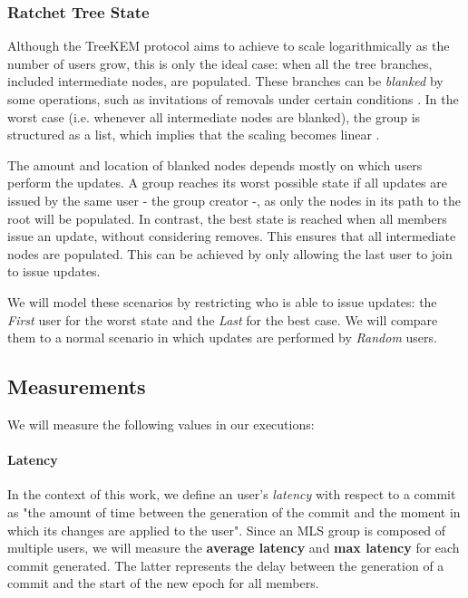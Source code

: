 \documentclass[preprint, 12pt]{elsarticle}
\begin{document}
\subsubsection{Ratchet Tree State}

Although the TreeKEM protocol aims to achieve to scale logarithmically as the number of users grow, this is only the ideal case: when all the tree branches, included intermediate nodes, are populated. These branches can be \textit{blanked} by some operations, such as invitations of removals under certain conditions \cite{ttkem}. In the worst case (i.e. whenever all intermediate nodes are blanked), the group is structured as a list, which implies that the scaling becomes linear \cite{itk}.

The amount and location of blanked nodes depends mostly on which users perform the updates. A group reaches its worst possible state if all updates are issued by the same user - the group creator -, as only the nodes in its path to the root will be populated. In contrast, the best state is reached when all members issue an update, without considering removes. This ensures that all intermediate nodes are populated. This can be achieved by only allowing the last user to join to issue updates.

We will model these scenarios by restricting who is able to issue updates: the \textit{First} user for the worst state and the \textit{Last} for the best case. We will compare them to a normal scenario in which updates are performed by \textit{Random} users. 

\subsection{Measurements}
\label{sec:measurements}

We will measure the following values in our executions:

\paragraph{\textbf{Latency}}

In the context of this work, we define an user's \textit{latency} with respect to a commit as "the amount of time between the generation of the commit and the moment in which its changes are applied to the user". Since an MLS group is composed of multiple users, we will measure the \textbf{average latency} and \textbf{max latency} for each commit generated. The latter represents the delay between the generation of a commit and the start of the new epoch for all members.
\end{document}
